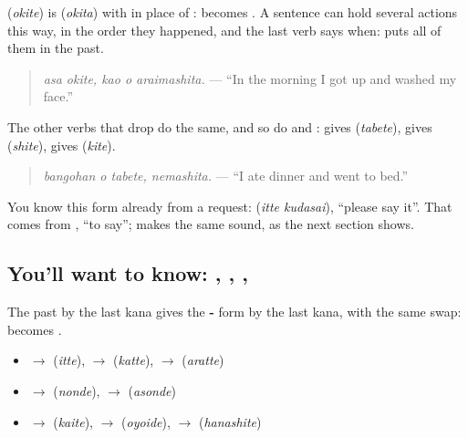 \textbf{} (\emph{okite}) is \textbf{} (\emph{okita}) with \textbf{} in place of \textbf{}: \textbf{} becomes \textbf{}. A sentence can hold several actions this way, in the order they happened, and the last verb says when: \textbf{} puts all of them in the past.

\begin{quote}
\textbf{  }
\end{quote}

\begin{quote}
\emph{asa okite, kao o araimashita.} — \textquotedblleft{}In the morning I got up and washed my face.\textquotedblright{}
\end{quote}

The other verbs that drop \textbf{} do the same, and so do \textbf{} and \textbf{}: \textbf{} gives \textbf{} (\emph{tabete}), \textbf{} gives \textbf{} (\emph{shite}), \textbf{} gives \textbf{} (\emph{kite}).

\begin{quote}
\textbf{ }
\end{quote}

\begin{quote}
\emph{bangohan o tabete, nemashita.} — \textquotedblleft{}I ate dinner and went to bed.\textquotedblright{}
\end{quote}

You know this form already from a request: \textbf{ } (\emph{itte kudasai}), \textquotedblleft{}please say it\textquotedblright{}. That \textbf{} comes from \textbf{}, \textquotedblleft{}to say\textquotedblright{}; \textbf{} makes the same sound, as the next section shows.

\subsection*{You'll want to know: , , , }
The past by the last kana gives the \textbf{-} form by the last kana, with the same swap: \textbf{} becomes \textbf{}.

\begin{itemize}
\raggedright
  \item \textbf{} $\to$ \textbf{} (\emph{itte}), \textbf{} $\to$ \textbf{} (\emph{katte}), \textbf{} $\to$ \textbf{} (\emph{aratte})
  \item \textbf{} $\to$ \textbf{} (\emph{nonde}), \textbf{} $\to$ \textbf{} (\emph{asonde})
  \item \textbf{} $\to$ \textbf{} (\emph{kaite}), \textbf{} $\to$ \textbf{} (\emph{oyoide}), \textbf{} $\to$ \textbf{} (\emph{hanashite})
\end{itemize}


